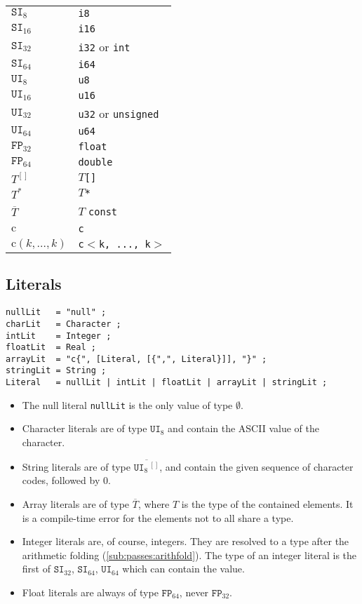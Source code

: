 \documentclass{article}
\newcommand{\R}[1]{\mathtt{#1}}
\begin{document}
\begin{tabular}{|l|l|}
\hline
$\R{SI}_8$ & \texttt{i8} \\
$\R{SI}_{16}$ & \texttt{i16} \\
$\R{SI}_{32}$ & \texttt{i32} or \texttt{int} \\
$\R{SI}_{64}$ & \texttt{i64} \\
$\R{UI}_8$ & \texttt{u8} \\
$\R{UI}_{16}$ & \texttt{u16} \\
$\R{UI}_{32}$ & \texttt{u32} or \texttt{unsigned} \\
$\R{UI}_{64}$ & \texttt{u64} \\
$\R{FP}_{32}$ & \texttt{float} \\
$\R{FP}_{64}$ & \texttt{double} \\
$T^{[]}$ & $T$\texttt{[]} \\
$T^*$ & $T$\texttt{*} \\
$\overline{T}$ & $T$ \texttt{const} \\
$\mathrm{c}$ & \texttt{c} \\
$\mathrm{c}(k,\ldots,k)$ & \texttt{c$<$k,~...,~k$>$} \\
\hline
\end{tabular}

\subsection{Literals}
\label{sub:types:literals}
\begin{verbatim}
nullLit   = "null" ;
charLit   = Character ;
intLit    = Integer ;
floatLit  = Real ;
arrayLit  = "c{", [Literal, [{",", Literal}]], "}" ;
stringLit = String ;
Literal   = nullLit | intLit | floatLit | arrayLit | stringLit ;
\end{verbatim}

\begin{itemize}
  \item{The null literal \texttt{nullLit} is the only value of type $\emptyset$.}
  \item{Character literals are of type $\R{UI}_{8}$ and contain the ASCII value
    of the character.}
  \item{String literals are of type $\overline{\R{UI}_{8}\,\!^{[]}}$, and contain
    the given sequence of character codes, followed by 0.}
  \item{Array literals are of type $\overline{T}$, where $T$ is the type of the
    contained elements. It is a compile-time error for the elements not to all
    share a type.}
  \item{Integer literals are, of course, integers. They are resolved to a type
    after the arithmetic folding (\ref{sub:passes:arithfold}). The type of an
    integer literal is the first of $\R{SI}_{32}$, $\R{SI}_{64}$, $\R{UI}_{64}$
    which can contain the value.}
  \item{Float literals are always of type $\R{FP}_{64}$, never $\R{FP}_{32}$.}
\end{itemize}
\end{document}
